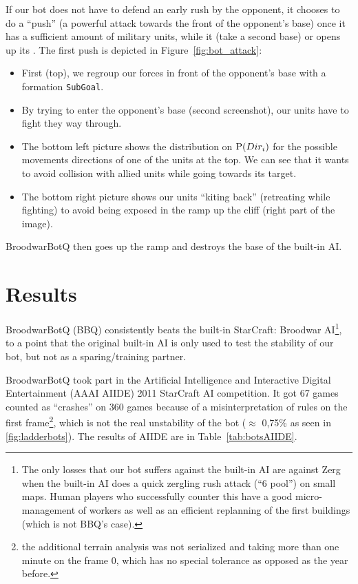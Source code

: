 If our bot does not have to defend an early rush by the opponent, it chooses to do a ``push'' (a powerful attack towards the front of the opponent's base) once it has a sufficient amount of military units, while it  (take a second base) or opens up its . The first push is depicted in Figure~\ref{fig:bot_attack}: 
\begin{itemize}
    \item First (top), we regroup our forces in front of the opponent's base with a formation \texttt{SubGoal}.
    \item By trying to enter the opponent's base (second screenshot), our units have to fight they way through.
    \item The bottom left picture shows the distribution on $\mathrm{P}(Dir_i)$ for the possible movements directions of one of the units at the top. We can see that it wants to avoid collision with allied units while going towards its target.
    \item The bottom right picture shows our units ``kiting back'' (retreating while fighting) to avoid being exposed in the ramp up the cliff (right part of the image).
\end{itemize}
BroodwarBotQ then goes up the ramp and destroys the base of the built-in AI.

\clearpage

\section{Results}

BroodwarBotQ (BBQ) consistently beats the built-in StarCraft: Broodwar AI\footnote{The only losses that our bot suffers against the built-in AI are against Zerg when the built-in AI does a quick zergling rush attack (``6 pool'') on small maps. Human players who successfully counter this have a good micro-management of workers as well as an efficient replanning of the first buildings (which is not BBQ's case).}, to a point that the original built-in AI is only used to test the stability of our bot, but not as a sparing/training partner.

BroodwarBotQ took part in the Artificial Intelligence and Interactive Digital Entertainment (AAAI AIIDE) 2011 StarCraft AI competition. It got 67 games counted as ``crashes'' on 360 games because of a misinterpretation of rules on the first frame\footnote{the additional terrain analysis was not serialized and taking more than one minute on the frame 0, which has no special tolerance as opposed as the year before.}, which is not the real unstability of the bot ($\approx$ 0,75\% as seen in \ref{fig:ladderbots}). The results of AIIDE are in Table~\ref{tab:botsAIIDE}.

